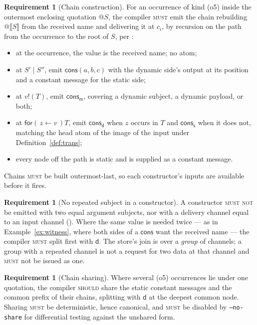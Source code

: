 \documentclass[11pt,a4paper]{article}
\makeatletter
\newcommand{\code}[1]{\texttt{#1}}
\newcommand{\MUST}{\textsc{must}}
\newcommand{\MUSTNOT}{\textsc{must not}}
\newcommand{\SHOULD}{\textsc{should}}
\newcommand{\quo}[1]{@#1}
\newcommand{\inp}[3]{\mathsf{for}(\,#1 \leftarrow #2\,)#3}
\newcommand{\out}[2]{#1!(#2)}
\newcommand{\enc}[1]{\llbracket #1 \rrbracket}
\newcommand{\mm}{\mathsf{m}}
\newcommand{\dd}{\mathsf{d}}
\newcommand{\sy}{\mathsf{s}}
\newcommand{\cons}{\mathsf{cons}}
\theoremstyle{definition}
\newtheorem{requirement}[definition]{Requirement}
\theoremstyle{plain}
\makeatother
\begin{document}
\begin{requirement}[Chain construction]\label{req:chain}
For an occurrence of kind (o5) inside the outermost enclosing quotation
$\quo{S}$, the compiler \MUST{} emit the chain rebuilding $\quo{\enc{S}}$ from
the received name and delivering it at $c_{i}$, by recursion on the path from
the occurrence to the root of $S$, per \cite[Prop.~3.9]{draft3}:
\begin{itemize}[leftmargin=1.6em]
\item at the occurrence, the value is the received name; no atom;
\item at $S' \mid S''$, emit $\cons(a,b,c)$ with the dynamic side's output at
its position and a constant message for the static side;
\item at $\out{v}{T}$, emit $\cons_{\mm}$, covering a dynamic subject, a
dynamic payload, or both;
\item at $\inp{z}{v}{T}$, emit $\cons_{\dd}$ when $z$ occurs in $T$ and
$\cons_{\sy}$ when it does not, matching the head atom of the image of the
input under Definition~\ref{def:trans};
\item every node off the path is static and is supplied as a constant message.
\end{itemize}
Chains \MUST{} be built outermost-last, so each constructor's inputs are
available before it fires.
\end{requirement}

\begin{requirement}[No repeated subject in a constructor]\label{req:norepeat}
A constructor \MUSTNOT{} be emitted with two equal argument subjects, nor with
a delivery channel equal to an input channel
(\cite[Rem.~3.4]{draft3}). Where the same value is needed twice --- as in
Example~\ref{ex:witness}, where both sides of a $\cons$ want the received
name --- the compiler \MUST{} split first with $\dd$. The store's join is over
a \emph{group} of channels; a group with a repeated channel is not a request
for two data at that channel and \MUST{} not be issued as one.
\end{requirement}

\begin{requirement}[Chain sharing]\label{req:share}
Where several (o5) occurrences lie under one quotation, the compiler \SHOULD{}
share the static constant messages and the common prefix of their chains,
splitting with $\dd$ at the deepest common node. Sharing \MUST{} be
deterministic, hence canonical, and \MUST{} be disabled by \code{--no-share}
for differential testing against the unshared form.
\end{requirement}
\end{document}
